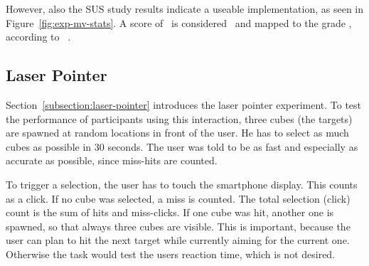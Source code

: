 However, also the \ac{SUS} study results indicate a useable implementation, as seen in Figure~\ref{fig:exp-mv-stats}. A score of \evalExpMvSusScore\ is considered \evalExpMvSusAdj\ and mapped to the grade \evalExpMvSusGrade, according to \citeauthor{Bangor.2009}~\cite[120\psq]{Bangor.2009}.



\subsection{Laser Pointer}\label{section:eval-res-lp}

Section~\ref{subsection:laser-pointer} introduces the laser pointer experiment. To test the performance of participants using this interaction, three cubes (the targets) are spawned at random locations in front of the user. He has to select as much cubes as possible in 30 seconds. The user was told to be as fast and especially as accurate as possible, since miss-hits are counted. 

To trigger a selection, the user has to touch the smartphone display. This counts as a click. If no cube was selected, a miss is counted. The total selection (click) count is the sum of hits and miss-clicks. If one cube was hit, another one is spawned, so that always three cubes are visible. This is important, because the user can plan to hit the next target while currently aiming for the current one. Otherwise the task would test the users reaction time, which is not desired. 

